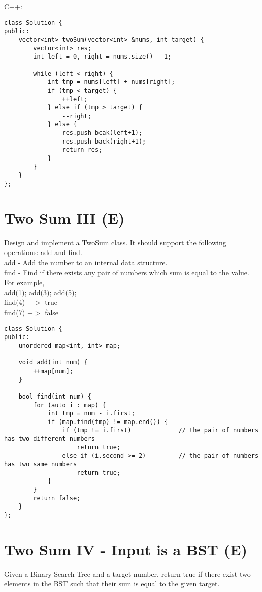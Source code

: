 C++:
\lstset{language=C++}
\begin{lstlisting}
class Solution {
public:
    vector<int> twoSum(vector<int> &nums, int target) {
        vector<int> res;
        int left = 0, right = nums.size() - 1;
        
        while (left < right) {
            int tmp = nums[left] + nums[right];
            if (tmp < target) {
                ++left;
            } else if (tmp > target) {
                --right;
            } else {
                res.push_bcak(left+1);
                res.push_back(right+1);
                return res;
            }
        }
    }
};
\end{lstlisting}


\section{Two Sum III (E)}
Design and implement a TwoSum class. It should support the following operations: add and find.\\

add - Add the number to an internal data structure.\\
find - Find if there exists any pair of numbers which sum is equal to the value.\\

For example,\\
add(1); add(3); add(5);\\
find(4) $->$ true\\
find(7) $->$ false\\

\begin{lstlisting}
class Solution {
public:
    unordered_map<int, int> map;
    
    void add(int num) {
        ++map[num];
    }
    
    bool find(int num) {
        for (auto i : map) {
            int tmp = num - i.first;
            if (map.find(tmp) != map.end()) {       
                if (tmp != i.first)             // the pair of numbers has two different numbers
                    return true;
                else if (i.second >= 2)         // the pair of numbers has two same numbers
                    return true;
            }
        }
        return false;
    }
};
\end{lstlisting}

\section{Two Sum IV - Input is a BST (E)}
Given a Binary Search Tree and a target number, return true if there exist two elements in the BST such that their sum is equal to the given target.

